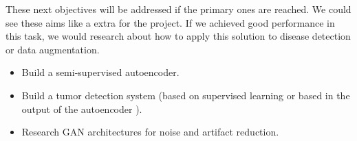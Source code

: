 These next objectives will be addressed if the primary ones are reached. We could see these aims like a extra for the project. If we achieved good performance in this task, we would research about how to apply this solution to disease detection or data augmentation.

\begin{itemize}
    \item Build a semi-supervised autoencoder.
    \item Build a tumor detection system (based on supervised learning or based in the output of the autoencoder \cite{pinaya2019}).
    \item Research GAN architectures for noise and artifact reduction.
\end{itemize}
